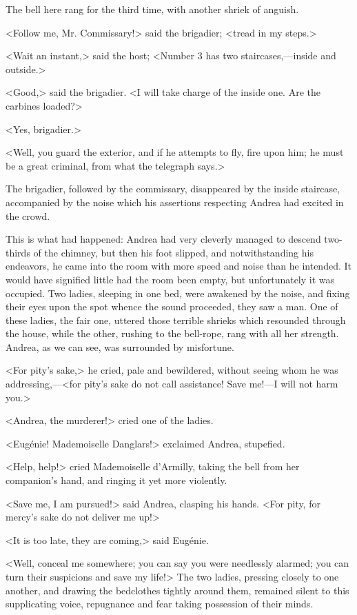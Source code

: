 The bell here rang for the third time, with another shriek of anguish. 

 <Follow me, Mr. Commissary!> said the brigadier; <tread in my steps.> 

 <Wait an instant,> said the host; <Number 3 has two staircases,—inside and outside.> 

 <Good,> said the brigadier. <I will take charge of the inside one. Are the carbines loaded?> 

 <Yes, brigadier.> 

 <Well, you guard the exterior, and if he attempts to fly, fire upon him; he must be a great criminal, from what the telegraph says.> 

 The brigadier, followed by the commissary, disappeared by the inside staircase, accompanied by the noise which his assertions respecting Andrea had excited in the crowd. 

 This is what had happened: Andrea had very cleverly managed to descend two-thirds of the chimney, but then his foot slipped, and notwithstanding his endeavors, he came into the room with more speed and noise than he intended. It would have signified little had the room been empty, but unfortunately it was occupied. Two ladies, sleeping in one bed, were awakened by the noise, and fixing their eyes upon the spot whence the sound proceeded, they saw a man. One of these ladies, the fair one, uttered those terrible shrieks which resounded through the house, while the other, rushing to the bell-rope, rang with all her strength. Andrea, as we can see, was surrounded by misfortune. 

 <For pity's sake,> he cried, pale and bewildered, without seeing whom he was addressing,—<for pity's sake do not call assistance! Save me!—I will not harm you.> 

 <Andrea, the murderer!> cried one of the ladies. 

 <Eugénie! Mademoiselle Danglars!> exclaimed Andrea, stupefied. 

 <Help, help!> cried Mademoiselle d'Armilly, taking the bell from her companion's hand, and ringing it yet more violently. 

 <Save me, I am pursued!> said Andrea, clasping his hands. <For pity, for mercy's sake do not deliver me up!> 

 <It is too late, they are coming,> said Eugénie. 

 <Well, conceal me somewhere; you can say you were needlessly alarmed; you can turn their suspicions and save my life!>  The two ladies, pressing closely to one another, and drawing the bedclothes tightly around them, remained silent to this supplicating voice, repugnance and fear taking possession of their minds. 

